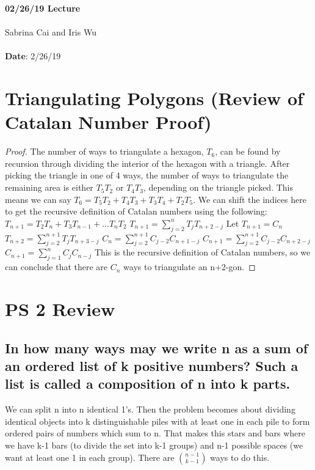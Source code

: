 \documentclass[11pt,twosided]{article}
\def\titlestring{02/26/19 Lecture}
\def\scribestring{Sabrina Cai and Iris Wu}
\def\datestring{2/26/19}
\begin{document}
\thispagestyle{plain}  %

\noindent
{\LARGE \textbf{\titlestring}}\\\\
%
{\Large \scribestring}\\ \\
{\textbf{Date}: \datestring}


\noindent

\section{Triangulating Polygons (Review of Catalan Number Proof)}
\begin{proof}
The number of ways to triangulate a hexagon, $T_6$, can be found by recursion through dividing the interior of the hexagon with a triangle. After picking the triangle in one of 4 ways, the number of ways to triangulate the remaining area is either $T_5T_2$ or $T_4T_3$, depending on the triangle picked. This means we can say $T_6=T_5T_2+T_4T_3+T_3T_4+T_2T_5$. We can shift the indices here to get the recursive definition of Catalan numbers using the following:
\newline
$T_{n+1}=T_2T_n+T_3T_{n-1}+...T_nT_2$
\newline
$T_{n+1}=\sum_{j=2}^{n} {T_jT_{n+2-j}}$
\newline
Let $T_{n+1}=C_n$
\newline
$T_{n+2}=\sum_{j=2}^{n+1} {T_jT_{n+3-j}}$
\newline
$C_n=\sum_{j=2}^{n+1} {C_{j-2}C_{n+1-j}}$
\newline
$C_{n+1}=\sum_{j=2}^{n+1} {C_{j-2}C_{n+2-j}}$
\newline
$C_{n+1}=\sum_{j=1}^{n} {C_{j}C_{n-j}}$
This is the recursive definition of Catalan numbers, so we can conclude that there are $C_n$ ways to triangulate an n+2-gon. 
\end{proof}
\section{PS 2 Review}


\subsection{In how many ways may we write n as a sum of an ordered list of k positive numbers? Such a list is called a composition of n into k parts.}
We can split n into n identical 1's. Then the problem becomes about dividing identical objects into k distinguishable piles with at least one in each pile to form ordered pairs of numbers which sum to n. That makes this stars and bars where we have k-1 bars (to divide the set into k-1 groups) and n-1 possible spaces (we want at least one 1 in each group). There are ${n-1 \choose k-1}$ ways to do this.
\end{document}

